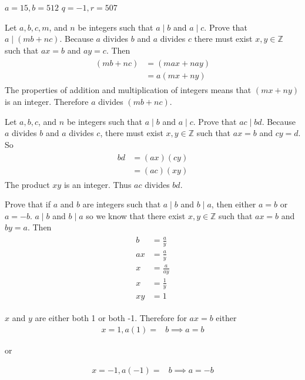 \documentclass[paper=a4, fontsize=11pt]{jhwhw} %
\begin{document}
$a=15, b=512$
\solution
$q=-1, r=507$

Let $a,b,c,m$, and $n$ be integers such that $a\mid b$ and $a\mid c$. Prove that $a\mid \left(mb+nc\right)$.
\solution
Because $a$ divides $b$ and $a$ divides $c$ there must exist $x,y\in \mathbb Z$ such that $ax=b$ and $ay=c$. Then
\begin{align}
\begin{split}
\left(mb+nc\right) &= \left(max + nay\right)\\
&=a\left(mx + ny\right)
\end{split}
\end{align}
The properties of addition and multiplication of integers means that $\left(mx + ny\right)$ is an integer. Therefore $a$ divides $\left(mb+nc\right)$.

Let $a,b,c$, and $n$ be integers such that $a\mid b$ and $a\mid c$. Prove that $ac\mid bd$.
\solution
Because $a$ divides $b$ and $a$ divides $c$, there must exist $x,y\in \mathbb Z$ such that $ax=b$ and $cy=d$. So
\begin{align}
\begin{split}
bd &= \left(ax\right)\left(cy\right)\\
&=\left(ac\right)\left(xy\right)
\end{split}
\end{align}
The product $xy$ is an integer. Thus $ac$ divides $bd$.

Prove that if $a$ and $b$ are integers such that $a\mid b$ and $b\mid a$, then either $a=b$ or $a=-b$.
\solution
$a\mid b$ and $b\mid a$ so we know that there exist $x,y \in \mathbb Z$ such that $ax=b$ and $by=a$. Then
\begin{align}
\begin{split}
b&=\frac{a}{y}\\
ax&=\frac{a}{y}\\
x&=\frac{a}{ay}\\
x&=\frac{1}{y}\\
xy&=1
\end{split}
\end{align}

$x$ and $y$ are either both 1 or both -1. Therefore for $ax=b$ either
\begin{align}
x=1, a\left(1\right) = &b \implies a=b
\end{align}
\centerline{or}
\begin{align}
x=-1, a\left(-1\right)=&b \implies a=-b
\end{align}
\end{document}
